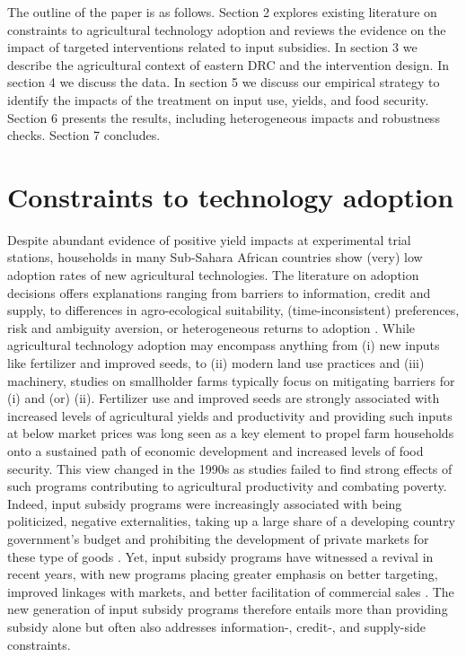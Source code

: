 The outline of the paper is as follows. Section 2 explores existing literature on constraints to agricultural technology adoption and reviews the evidence on the impact of targeted interventions related to input subsidies. In section 3 we describe the agricultural context of eastern DRC and the intervention design. In section 4 we discuss the data. In section 5 we discuss our empirical strategy to identify the impacts of the treatment on input use, yields, and food security. Section 6 presents the results, including heterogeneous impacts and robustness checks. Section 7 concludes.

\section{Constraints to technology adoption}
Despite abundant evidence of positive yield impacts at experimental trial stations, households in many Sub-Sahara African countries show (very) low adoption rates of new agricultural technologies. The literature on adoption decisions offers explanations ranging from barriers to information, credit and supply, to differences in agro-ecological suitability, (time-inconsistent) preferences, risk and ambiguity aversion, or heterogeneous returns to adoption \citep{Duflo2011,Suri2011,Dercon2011,Ross2012,Barham2014}. While agricultural technology adoption may encompass anything from (i) new inputs like fertilizer and improved seeds, to (ii) modern land use practices and (iii) machinery, studies on smallholder farms typically focus on mitigating barriers for (i) and (or) (ii). Fertilizer use and improved seeds are strongly associated with increased levels of agricultural yields and productivity and providing such inputs at below market prices was long seen as a key element to propel farm households onto a sustained path of economic development and increased levels of food security. This view changed in the 1990s as studies failed to find strong effects of such programs contributing to agricultural productivity and combating poverty. Indeed, input subsidy programs were increasingly associated with being politicized, negative externalities, taking up a large share of a developing country government’s budget and prohibiting the development of private markets for these type of goods \citep{WorldBank2000,Pan2012,Jayne2018}. Yet, input subsidy programs have witnessed a revival in recent years, with new programs placing greater emphasis on better targeting, improved linkages with markets, and better facilitation of commercial sales \cite[e.g][]{Morris2007,WorldBank2000}. The new generation of input subsidy programs therefore entails more than providing subsidy alone but often also addresses information-, credit-, and supply-side constraints. 

